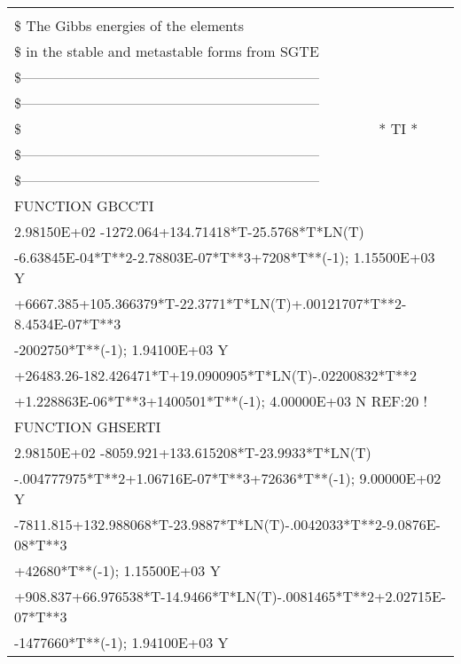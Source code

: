\begin{longtable}[H]{ l l l }
	\label{ab-table:timonbtazr1} \\
	\endhead
	\hline
	\endfoot
	\multicolumn{3}{l}{\$*************************************************************}\\
	\multicolumn{3}{l}{\$ The Gibbs energies of the elements}\\
	\multicolumn{3}{l}{\$ in the stable and metastable forms from SGTE}\\
	\multicolumn{3}{l}{\$---------------------------------------------------------------}\\
	\multicolumn{3}{l}{\$---------------------------------------------------------------}\\
	\$ & \multicolumn{2}{c}{* TI *}\\
	\multicolumn{3}{l}{\$---------------------------------------------------------------}\\
	\multicolumn{3}{l}{\$---------------------------------------------------------------}\\
	FUNCTION GBCCTI & & \\
	\multicolumn{3}{l}{2.98150E+02  -1272.064+134.71418*T-25.5768*T*LN(T)}\\
	\multicolumn{3}{l}{-6.63845E-04*T**2-2.78803E-07*T**3+7208*T**(-1);  1.15500E+03  Y}\\
	\multicolumn{3}{l}{+6667.385+105.366379*T-22.3771*T*LN(T)+.00121707*T**2-8.4534E-07*T**3}\\
	\multicolumn{3}{l}{-2002750*T**(-1);  1.94100E+03  Y}\\
	\multicolumn{3}{l}{+26483.26-182.426471*T+19.0900905*T*LN(T)-.02200832*T**2}\\
	\multicolumn{3}{l}{+1.228863E-06*T**3+1400501*T**(-1);  4.00000E+03  N REF:20 !}\\
	FUNCTION GHSERTI & & \\
	\multicolumn{3}{l}{2.98150E+02  -8059.921+133.615208*T-23.9933*T*LN(T)}\\
	\multicolumn{3}{l}{-.004777975*T**2+1.06716E-07*T**3+72636*T**(-1);  9.00000E+02  Y}\\
	\multicolumn{3}{l}{-7811.815+132.988068*T-23.9887*T*LN(T)-.0042033*T**2-9.0876E-08*T**3}\\
	\multicolumn{3}{l}{+42680*T**(-1);  1.15500E+03  Y}\\
	\multicolumn{3}{l}{+908.837+66.976538*T-14.9466*T*LN(T)-.0081465*T**2+2.02715E-07*T**3}\\
	\multicolumn{3}{l}{-1477660*T**(-1);  1.94100E+03  Y}\\

\end{longtable}
